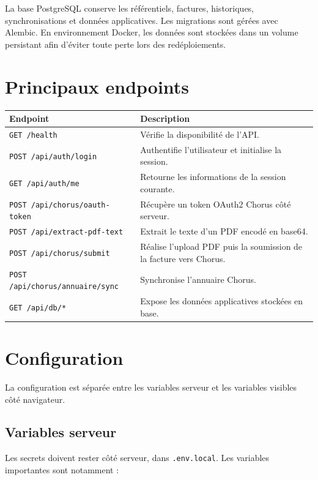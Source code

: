 \documentclass[11pt,a4paper]{article}
\begin{document}
La base PostgreSQL conserve les référentiels, factures, historiques,
synchronisations et données applicatives. Les migrations sont gérées avec
Alembic. En environnement Docker, les données sont stockées dans un volume
persistant afin d'éviter toute perte lors des redéploiements.

\section{Principaux endpoints}

\begin{longtable}{|p{}|p{}|}
  \hline
  \textbf{Endpoint} & \textbf{Description} \\
  \hline
  \texttt{GET /health} &
  Vérifie la disponibilité de l'API. \\
  \hline
  \texttt{POST /api/auth/login} &
  Authentifie l'utilisateur et initialise la session. \\
  \hline
  \texttt{GET /api/auth/me} &
  Retourne les informations de la session courante. \\
  \hline
  \texttt{POST /api/chorus/oauth-token} &
  Récupère un token OAuth2 Chorus côté serveur. \\
  \hline
  \texttt{POST /api/extract-pdf-text} &
  Extrait le texte d'un PDF encodé en base64. \\
  \hline
  \texttt{POST /api/chorus/submit} &
  Réalise l'upload PDF puis la soumission de la facture vers Chorus. \\
  \hline
  \texttt{POST /api/chorus/annuaire/sync} &
  Synchronise l'annuaire Chorus. \\
  \hline
  \texttt{GET /api/db/*} &
  Expose les données applicatives stockées en base. \\
  \hline
\end{longtable}

\section{Configuration}

La configuration est séparée entre les variables serveur et les variables
visibles côté navigateur.

\subsection{Variables serveur}

Les secrets doivent rester côté serveur, dans \texttt{.env.local}. Les variables
importantes sont notamment :
\end{document}

